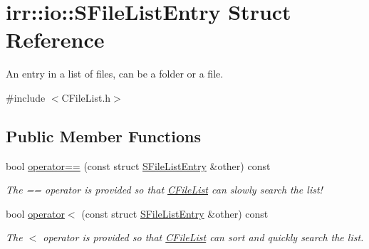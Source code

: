 \hypertarget{structirr_1_1io_1_1_s_file_list_entry}{\section{irr\-:\-:io\-:\-:S\-File\-List\-Entry Struct Reference}
\label{structirr_1_1io_1_1_s_file_list_entry}
}


An entry in a list of files, can be a folder or a file.  




{\ttfamily \#include $<$C\-File\-List.\-h$>$}

\subsection*{Public Member Functions}
\begin{DoxyCompactItemize}
\item 
\hypertarget{structirr_1_1io_1_1_s_file_list_entry_aeae10df6f851fade2c58562e3f77e018}{bool \hyperlink{structirr_1_1io_1_1_s_file_list_entry_aeae10df6f851fade2c58562e3f77e018}{operator==} (const struct \hyperlink{structirr_1_1io_1_1_s_file_list_entry}{S\-File\-List\-Entry} \&other) const }\label{structirr_1_1io_1_1_s_file_list_entry_aeae10df6f851fade2c58562e3f77e018}

\begin{DoxyCompactList}\small\item\em The == operator is provided so that \hyperlink{classirr_1_1io_1_1_c_file_list}{C\-File\-List} can slowly search the list! \end{DoxyCompactList}\item 
\hypertarget{structirr_1_1io_1_1_s_file_list_entry_a321e45459c9781a45fc7bc8858524e1a}{bool \hyperlink{structirr_1_1io_1_1_s_file_list_entry_a321e45459c9781a45fc7bc8858524e1a}{operator$<$} (const struct \hyperlink{structirr_1_1io_1_1_s_file_list_entry}{S\-File\-List\-Entry} \&other) const }\label{structirr_1_1io_1_1_s_file_list_entry_a321e45459c9781a45fc7bc8858524e1a}

\begin{DoxyCompactList}\small\item\em The $<$ operator is provided so that \hyperlink{classirr_1_1io_1_1_c_file_list}{C\-File\-List} can sort and quickly search the list. \end{DoxyCompactList}\end{DoxyCompactItemize}

